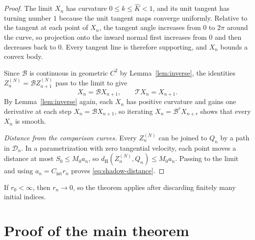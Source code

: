\documentclass[11pt]{article}
\numberwithin{equation}{section}
\newcommand{\Tmap}{\mathcal T}
\newcommand{\Bmap}{\mathcal B}
\begin{document}
\begin{proof}
The limit \(X_n\) has curvature \(0\leq k\leq\widehat K<1\), and
its unit tangent has turning number \(1\) because the unit tangent maps
converge uniformly. Relative to the tangent at each point of \(X_n\), the
tangent angle increases from \(0\) to \(2\pi\) around the curve, so projection
onto the inward normal first increases from \(0\) and then decreases back to
\(0\). Every tangent line is therefore supporting, and \(X_n\) bounds a convex
body.

Since \(\Bmap\) is continuous in geometric \(C^2\) by
Lemma~\ref{lem:inverse}, the identities \(Z_n^{(N)}=\Bmap Z_{n+1}^{(N)}\)
pass to the limit to give
\[
  X_n=\Bmap X_{n+1},\qquad \Tmap X_n=X_{n+1}.
\]
By Lemma~\ref{lem:inverse} again, each \(X_n\) has positive curvature and
gains one derivative at each step \(X_n=\Bmap X_{n+1}\), so iterating
\(X_n=\Bmap^rX_{n+r}\) shows that every \(X_n\) is smooth.

\emph{Distance from the comparison curves.}
Every \(Z_n^{(N)}\) can be joined to \(Q_n\) by a path in \(\mathcal D_n\).
In a parametrization with zero tangential velocity, each point moves a
distance at most \(S_0\leq M_0a_n\), so
\(d_{\mathrm H}(Z_n^{(N)},Q_n)\leq M_0a_n\). Passing to the limit and
using \(a_n=C_{\mathrm{int}}r_n\) proves \eqref{eq:shadow-distance}.
\end{proof}

If \(r_0<\infty\), then \(r_n\to0\), so the theorem applies after
discarding finitely many initial indices.

\section{Proof of the main theorem}\label{sec:application}
\end{document}
